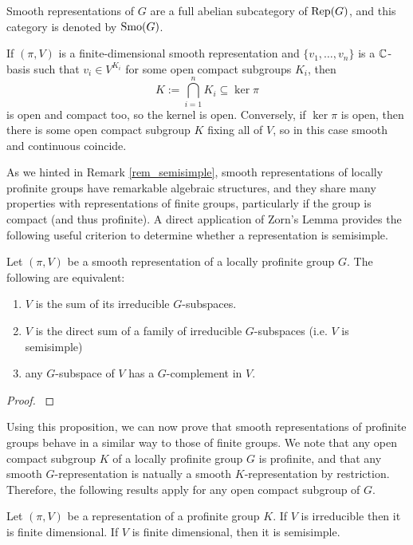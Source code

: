 Smooth representations of $G$ are a full abelian subcategory of $\mathrm{Rep}(G)$, and this category is denoted by $\mathrm{Smo}(G)$. 


\begin{rem}
    If $(\pi,V)$ is a finite-dimensional smooth representation and $\{v_1,\ldots,v_n\}$ is a $\mathbb{C}$-basis such that $v_i\in V^{K_i}$ for some open compact subgroups $K_i$, then 
    $$K:=\bigcap_{i=1}^n K_i\subseteq\ker\pi$$
    is open and compact too, so the kernel is open. 
    Conversely, if $\ker\pi$ is open, then there is some open compact subgroup $K$ fixing all of $V$, so in this case smooth and continuous coincide. 
\end{rem}


As we hinted in Remark \ref{rem_semisimple}, smooth representations of locally profinite groups have remarkable algebraic structures, and they share many properties with representations of finite groups, particularly if the group is compact (and thus profinite). A direct application of Zorn's Lemma provides the following useful criterion to determine whether a representation is semisimple. 

\begin{prop}\label{prop_semisimple}
    Let $(\pi,V)$ be a smooth representation of a locally profinite group $G$. The following are equivalent:
    \begin{enumerate}
        \item $V$ is the sum of its irreducible $G$-subspaces.
        \item $V$ is the direct sum of a family of irreducible $G$-subspaces (i.e. $V$ is semisimple)
        \item any $G$-subspace of $V$ has a $G$-complement in $V$.
    \end{enumerate}
\end{prop}

\begin{proof}
    \cite[Lemma 2.2]{BH1}
\end{proof}

Using this proposition, we can now prove that smooth representations of profinite groups behave in a similar way to those of finite groups. We note that any open compact subgroup $K$ of a locally profinite group $G$ is profinite, and that any smooth $G$-representation is natually a smooth $K$-representation by restriction. Therefore, the following results apply for any open compact subgroup of $G$.

\begin{prop}\label{lem_profinite_smooth}
    Let $(\pi,V)$ be a representation of a profinite group $K$. If $V$ is irreducible then it is finite dimensional. If $V$ is finite dimensional, then it is semisimple.
\end{prop}

